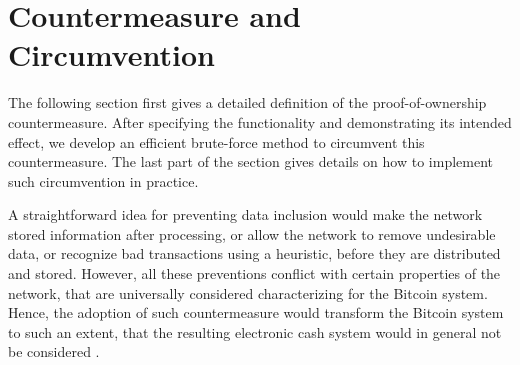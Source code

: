 \documentclass[a4paper,11pt,titlepage]{scrbook}
\begin{document}



\chapter{Countermeasure and Circumvention}

The following section first gives a detailed definition of the proof-of-ownership countermeasure. After specifying the functionality and demonstrating its intended effect, we develop an efficient brute-force method to circumvent this countermeasure. The last part of the section gives details on how to implement such circumvention in practice.

A straightforward idea for preventing data inclusion would make the network  stored information after processing, or allow the network to remove undesirable data, or recognize bad transactions using a heuristic, before they are distributed and stored.
However, all these preventions conflict with certain properties of the network, that are universally considered characterizing for the Bitcoin system.
Hence, the adoption of such countermeasure would transform the Bitcoin system to such an extent, that the resulting electronic cash system would in general not be considered .
\end{document}
